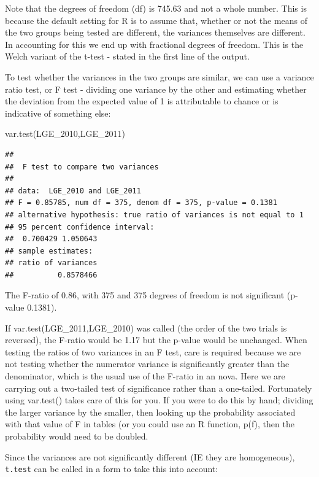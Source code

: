 \documentclass[
]{book}
\newenvironment{Shaded}{\begin{snugshade}}{\end{snugshade}}
\newcommand{\FunctionTok}[1]{\textcolor[rgb]{0.00,0.00,0.00}{#1}}
\newcommand{\NormalTok}[1]{#1}
\begin{document}
Note that the degrees of freedom (df) is 745.63 and not a whole number. This is because the default setting for R is to assume that, whether or not the means of the two groups being tested are different, the variances themselves are different. In accounting for this we end up with fractional degrees of freedom. This is the Welch variant of the t-test - stated in the first line of the output.

To test whether the variances in the two groups are similar, we can use a variance ratio test, or F test - dividing one variance by the other and estimating whether the deviation from the expected value of 1 is attributable to chance or is indicative of something else:

\begin{Shaded}
\begin{Highlighting}[]
\FunctionTok{var.test}\NormalTok{(LGE\_2010,LGE\_2011)}
\end{Highlighting}
\end{Shaded}

\begin{verbatim}
## 
##  F test to compare two variances
## 
## data:  LGE_2010 and LGE_2011
## F = 0.85785, num df = 375, denom df = 375, p-value = 0.1381
## alternative hypothesis: true ratio of variances is not equal to 1
## 95 percent confidence interval:
##  0.700429 1.050643
## sample estimates:
## ratio of variances 
##          0.8578466
\end{verbatim}

The F-ratio of 0.86, with 375 and 375 degrees of freedom is not significant (p-value 0.1381).

If var.test(LGE\_2011,LGE\_2010) was called (the order of the two trials is reversed), the F-ratio would be 1.17 but the p-value would be unchanged. When testing the ratios of two variances in an F test, care is required because we are not testing whether the numerator variance is significantly greater than the denominator, which is the usual use of the F-ratio in an nova. Here we are carrying out a two-tailed test of significance rather than a one-tailed. Fortunately using var.test() takes care of this for you. If you were to do this by hand; dividing the larger variance by the smaller, then looking up the probability associated with that value of F in tables (or you could use an R function, p(f), then the probability would need to be doubled.

Since the variances are not significantly different (IE they are homogeneous), \texttt{t.test} can be called in a form to take this into account:
\end{document}
